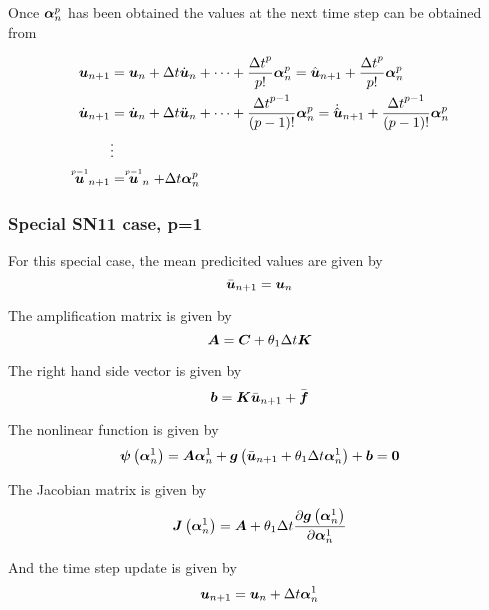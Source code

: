 Once $\vect{\alpha}^{p}_{n}$ has been obtained the values at the next time
step can be obtained from

\begin{equation}
  \begin{split}
    \vect{u}_{n+1} &= \vect{u}_{n}+\Delta t
    \dot{\vect{u}}_{n}+\cdots+\dfrac{{\Delta t}^{p}}{p!}\vect{\alpha}^{p}_{n}=\hat{\vect{u}}_{n+1}+\dfrac{{\Delta t}^{p}}{p!}\vect{\alpha}^{p}_{n}\\
    \dot{\vect{u}}_{n+1} &= \dot{\vect{u}}_{n}+\Delta t
    \ddot{\vect{u}}_{n}+\cdots+\dfrac{{\Delta
        t}^{p-1}}{\factorial{p-1}}\vect{\alpha}^{p}_{n}=\dot{\hat{\vect{u}}}_{n+1}+\dfrac{{\Delta
        t}^{p-1}}{\factorial{p-1}}\vect{\alpha}^{p}_{n} \\
    &\vdots \\
    \symover{p-1}{\vect{u}}_{n+1} &= \symover{p-1}{\vect{u}}_{n}+\Delta t\vect{\alpha}^{p}_{n}
  \end{split}
\end{equation}


\subsubsection{Special SN11 case, p=1}

For this special case, the mean predicited values are given by
\begin{equation}
   \bar{\vect{u}}_{n+1} = \vect{u}_{n}
\end{equation}

The amplification matrix is given by
\begin{equation}
  \matr{A}=\matr{C}+\theta_{1}\Delta t \matr{K}
\end{equation}

The right hand side vector is given by
\begin{equation}
  \vect{b}=\matr{K}\bar{\vect{u}}_{n+1}+\bar{\vect{f}}
\end{equation}

The nonlinear function is given by
\begin{equation}
  \fnof{\vect{\psi}}{\vect{\alpha}^{1}_{n}}=\matr{A}\vect{\alpha}^{1}_{n}+\fnof{\vect{g}}{\bar{\vect{u}}_{n+1}+ \theta_{1}\Delta
    t\vect{\alpha}^{1}_{n}}+\vect{b}=\vect{0}
\end{equation}

The Jacobian matrix is given by
\begin{equation}
  \fnof{\matr{J}}{\vect{\alpha}^{1}_{n}}=\matr{A}+\theta_{1}\Delta t \delby{\fnof{\vect{g}}{\vect{\alpha}^{1}_{n}}}{\vect{\alpha}^{1}_{n}}
\end{equation}

And the time step update is given by
\begin{equation}
    \vect{u}_{n+1} = \vect{u}_{n}+\Delta t\vect{\alpha}^{1}_{n}
\end{equation}

